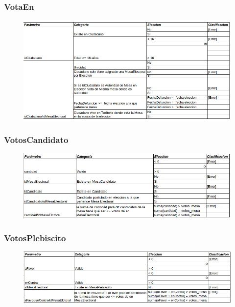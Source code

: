 \subsubsection{VotaEn}

\begin{figure}[H]
   \begin{center}
   \includegraphics[scale=0.6]{graphics/votaen.png}
   \label{fig:der}
   \end{center}
\end{figure}



\subsubsection{VotosCandidato}

\begin{figure}[H]
   \begin{center}
   \includegraphics[scale=0.6]{graphics/votoscandidato.png}
   \label{fig:der}
   \end{center}
\end{figure}


\subsubsection{VotosPlebiscito}

\begin{figure}[H]
   \begin{center}
   \includegraphics[scale=0.6]{graphics/votosplebiscito.png}
   \label{fig:der}
   \end{center}
\end{figure}



